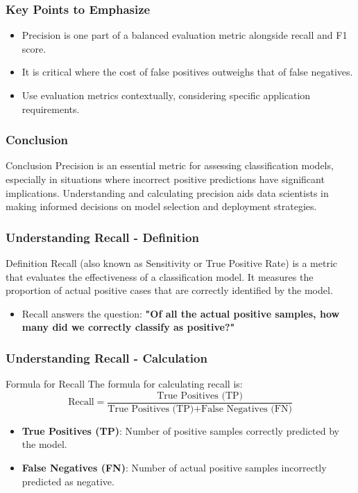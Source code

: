 \documentclass[aspectratio=169]{beamer}
\begin{document}
\begin{frame}[fragile]
    \frametitle{Key Points to Emphasize}
    \begin{itemize}
        \item Precision is one part of a balanced evaluation metric alongside recall and F1 score.
        \item It is critical where the cost of false positives outweighs that of false negatives.
        \item Use evaluation metrics contextually, considering specific application requirements.
    \end{itemize}
\end{frame}

\begin{frame}[fragile]
    \frametitle{Conclusion}
    \begin{block}{Conclusion}
        Precision is an essential metric for assessing classification models, especially in situations where incorrect positive predictions have significant implications. Understanding and calculating precision aids data scientists in making informed decisions on model selection and deployment strategies.
    \end{block}
\end{frame}

\begin{frame}[fragile]
    \frametitle{Understanding Recall - Definition}
    \begin{block}{Definition}
        Recall (also known as Sensitivity or True Positive Rate) is a metric that evaluates the effectiveness of a classification model. It measures the proportion of actual positive cases that are correctly identified by the model.
    \end{block}
    \begin{itemize}
        \item Recall answers the question: \textbf{"Of all the actual positive samples, how many did we correctly classify as positive?"}
    \end{itemize}
\end{frame}

\begin{frame}[fragile]
    \frametitle{Understanding Recall - Calculation}
    \begin{block}{Formula for Recall}
        The formula for calculating recall is:
        \begin{equation}
            \text{Recall} = \frac{\text{True Positives (TP)}}{\text{True Positives (TP)} + \text{False Negatives (FN)}}
        \end{equation}
    \end{block}
    \begin{itemize}
        \item \textbf{True Positives (TP)}: Number of positive samples correctly predicted by the model.
        \item \textbf{False Negatives (FN)}: Number of actual positive samples incorrectly predicted as negative.
    \end{itemize}
\end{frame}
\end{document}
